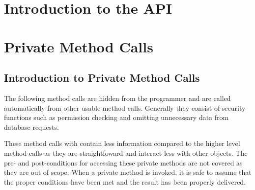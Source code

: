 \documentclass[letterpaper,12pt]{report}
\begin{document}
\begin{comment}
  \newline
  \hspace*{0.5cm}<h3>Notes</h3>\linebreak
  \hspace*{1cm}<p>Notes go here</p>\linebreak
  \newline
  \hspace*{0.5cm}<h3>Pre-Condition</h3>\linebreak
  \hspace*{1cm}<p>Pre conditions go here</p>\linebreak
  \newline
  \hspace*{0.5cm}<h3>Post-Conditions</h3>\linebreak
  \hspace*{1cm}<p>Post conditions go here</p>\linebreak
  \newline
  \hspace*{0.5cm}<h3>Errors</h3>\linebreak
  \hspace*{1cm}<p>Errors go here</p>\linebreak
  \newline
  \hspace*{0.5cm}<h3>Related Methods</h3>\linebreak
  \hspace*{1cm}<p><a href="\#">Related Method 1 Link</a></p>\linebreak }
\end{comment}

{
\chapter{Introduction to the API}
\pagebreak
}

{
\chapter{Private Method Calls}
  \pagebreak
  \section{Introduction to Private Method Calls}
  \par \noindent
    \hspace*{1cm} The following method calls are hidden from the programmer and are called automatically from other usable method calls. Generally they consist of security functions such as permission checking and omitting unnecessary data from database requests.
    \par These method calls with contain less information compared to the higher level method calls as they are straightfoward and interact less with other objects. The pre- and post-conditions for accessing these private methods are not covered as they are out of scope. When a private method is invoked, it is safe to assume that the proper conditions have been met and the result has been properly delivered.

}
\end{document}
